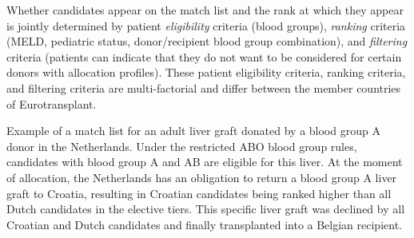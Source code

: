 \documentclass[11pt,twoside,]{book}
\begin{document}
Whether candidates appear on the match list and the rank at which they appear
is jointly determined by patient \emph{eligibility} criteria (blood
groups), \emph{ranking} criteria (MELD, pediatric status, donor/recipient blood
group combination), and \emph{filtering} criteria (patients can indicate that they
do not want to be considered for certain donors with allocation
profiles). These patient eligibility criteria, ranking criteria, and
filtering criteria are multi-factorial and differ between the member countries of Eurotransplant.
\newpage

\begin{table}[h]
\caption{Example of a match list for an adult liver graft donated by a blood group A donor in the Netherlands. Under the restricted ABO blood group rules, candidates
  with blood group A and AB are eligible for this liver. At the moment of allocation, the Netherlands has an obligation to return a blood group A liver graft to Croatia, resulting in Croatian candidates being ranked higher than all Dutch candidates in the elective tiers. This specific liver graft was declined by all Croatian and Dutch candidates and finally transplanted into a Belgian recipient.}
\label{tab:ch5tab1}
\centering
\resizebox{1\ifdim\width>\linewidth\linewidth\else\width\fi}{!}{%

}
\end{table}
\end{document}
